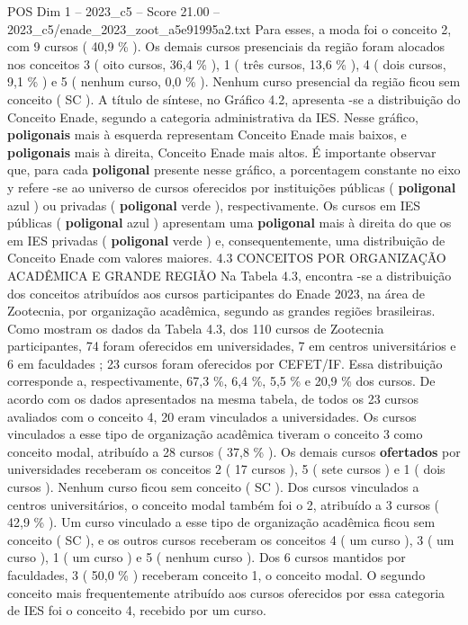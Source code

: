 \begin{textsample}{POS Dim 1 – 2023\_c5 – Score 21.00 – 2023\_c5/enade\_2023\_zoot\_a5e91995a2.txt}
Para esses, a moda foi o conceito 2, com 9 cursos ( 40,9 \% ).
Os demais cursos presenciais da região foram alocados nos conceitos 3 ( oito cursos, 36,4 \% ), 1 ( três cursos, 13,6 \% ), 4 ( dois cursos, 9,1 \% ) e 5 ( nenhum curso, 0,0 \% ).
Nenhum curso presencial da região ficou sem conceito ( SC ).
A título de síntese, no Gráfico 4.2, apresenta -se a distribuição do Conceito Enade, segundo a categoria administrativa da IES.
Nesse gráfico, \textbf{poligonais} mais à esquerda representam Conceito Enade mais baixos, e \textbf{poligonais} mais à direita, Conceito Enade mais altos.
É importante observar que, para cada \textbf{poligonal} presente nesse gráfico, a porcentagem constante no eixo y refere -se ao universo de cursos oferecidos por instituições públicas ( \textbf{poligonal} azul ) ou privadas ( \textbf{poligonal} verde ), respectivamente.
Os cursos em IES públicas ( \textbf{poligonal} azul ) apresentam uma \textbf{poligonal} mais à direita do que os em IES privadas ( \textbf{poligonal} verde ) e, consequentemente, uma distribuição de Conceito Enade com valores maiores. 4.3 CONCEITOS POR ORGANIZAÇÃO ACADÊMICA E GRANDE REGIÃO Na Tabela 4.3, encontra -se a distribuição dos conceitos atribuídos aos cursos participantes do Enade 2023, na área de Zootecnia, por organização acadêmica, segundo as grandes regiões brasileiras.
Como mostram os dados da Tabela 4.3, dos 110 cursos de Zootecnia participantes, 74 foram oferecidos em universidades, 7 em centros universitários e 6 em faculdades ; 23 cursos foram oferecidos por CEFET/IF.
Essa distribuição corresponde a, respectivamente, 67,3 \%, 6,4 \%, 5,5 \% e 20,9 \% dos cursos.
De acordo com os dados apresentados na mesma tabela, de todos os 23 cursos avaliados com o conceito 4, 20 eram vinculados a universidades.
Os cursos vinculados a esse tipo de organização acadêmica tiveram o conceito 3 como conceito modal, atribuído a 28 cursos ( 37,8 \% ).
Os demais cursos \textbf{ofertados} por universidades receberam os conceitos 2 ( 17 cursos ), 5 ( sete cursos ) e 1 ( dois cursos ).
Nenhum curso ficou sem conceito ( SC ).
Dos cursos vinculados a centros universitários, o conceito modal também foi o 2, atribuído a 3 cursos ( 42,9 \% ).
Um curso vinculado a esse tipo de organização acadêmica ficou sem conceito ( SC ), e os outros cursos receberam os conceitos 4 ( um curso ), 3 ( um curso ), 1 ( um curso ) e 5 ( nenhum curso ).
Dos 6 cursos mantidos por faculdades, 3 ( 50,0 \% ) receberam conceito 1, o conceito modal.
O segundo conceito mais frequentemente atribuído aos cursos oferecidos por essa categoria de IES foi o conceito 4, recebido por um curso.

\end{textsample}
